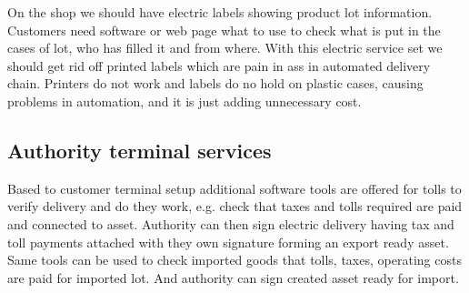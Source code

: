 On the shop we should have electric labels showing product lot information.
Customers need software or web page what to use to check what is put in the
cases of lot, who has filled it and from where. With this electric service set
we should get rid off printed labels which are pain in ass in automated
delivery chain. Printers do not work and labels do no hold on plastic cases,
causing problems in automation, and it is just adding unnecessary cost.

\subsection{Authority terminal services}
\label{authority_terminal_service}

Based to customer terminal setup additional software tools are offered for
tolls to verify delivery and do they work, e.g. check that taxes and tolls
required are paid and connected to asset. Authority can then sign electric
delivery having tax and toll payments attached with they own signature
forming an export ready asset. Same tools can be used to check imported
goods that tolls, taxes, operating costs are paid for imported lot. And
authority can sign created asset ready for import.

